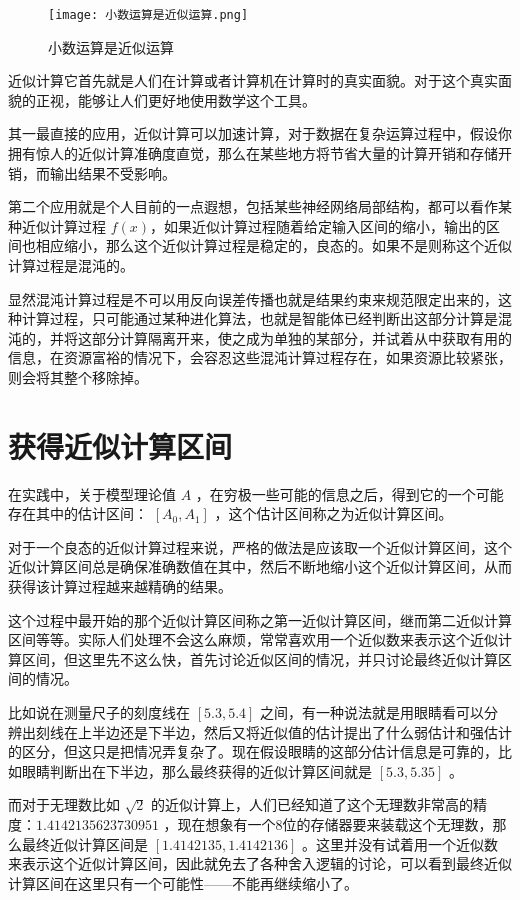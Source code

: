 \documentclass[12pt,oneside]{book}
\begin{document}
\begin{figure}[H]
\centering
\texttt{[image: 小数运算是近似运算.png]}
\caption{小数运算是近似运算}
\end{figure}

近似计算它首先就是人们在计算或者计算机在计算时的真实面貌。对于这个真实面貌的正视，能够让人们更好地使用数学这个工具。

其一最直接的应用，近似计算可以加速计算，对于数据在复杂运算过程中，假设你拥有惊人的近似计算准确度直觉，那么在某些地方将节省大量的计算开销和存储开销，而输出结果不受影响。

第二个应用就是个人目前的一点遐想，包括某些神经网络局部结构，都可以看作某种近似计算过程 $f(x)$，如果近似计算过程随着给定输入区间的缩小，输出的区间也相应缩小，那么这个近似计算过程是稳定的，良态的。如果不是则称这个近似计算过程是混沌的。

显然混沌计算过程是不可以用反向误差传播也就是结果约束来规范限定出来的，这种计算过程，只可能通过某种进化算法，也就是智能体已经判断出这部分计算是混沌的，并将这部分计算隔离开来，使之成为单独的某部分，并试着从中获取有用的信息，在资源富裕的情况下，会容忍这些混沌计算过程存在，如果资源比较紧张，则会将其整个移除掉。



\section{获得近似计算区间}
在实践中，关于模型理论值 $A$ ，在穷极一些可能的信息之后，得到它的一个可能存在其中的估计区间： $[A_0, A_1]$ ，这个估计区间称之为近似计算区间。

对于一个良态的近似计算过程来说，严格的做法是应该取一个近似计算区间，这个近似计算区间总是确保准确数值在其中，然后不断地缩小这个近似计算区间，从而获得该计算过程越来越精确的结果。

这个过程中最开始的那个近似计算区间称之第一近似计算区间，继而第二近似计算区间等等。实际人们处理不会这么麻烦，常常喜欢用一个近似数来表示这个近似计算区间，但这里先不这么快，首先讨论近似区间的情况，并只讨论最终近似计算区间的情况。

比如说在测量尺子的刻度线在 $[5.3, 5.4]$ 之间，有一种说法就是用眼睛看可以分辨出刻线在上半边还是下半边，然后又将近似值的估计提出了什么弱估计和强估计的区分，但这只是把情况弄复杂了。现在假设眼睛的这部分估计信息是可靠的，比如眼睛判断出在下半边，那么最终获得的近似计算区间就是 $[5.3, 5.35]$ 。

而对于无理数比如 $\sqrt{2}$ 的近似计算上，人们已经知道了这个无理数非常高的精度：$ 1.4142135623730951 $ ，现在想象有一个8位的存储器要来装载这个无理数，那么最终近似计算区间是 $ [1.4142135, 1.4142136] $ 。这里并没有试着用一个近似数来表示这个近似计算区间，因此就免去了各种舍入逻辑的讨论，可以看到最终近似计算区间在这里只有一个可能性——不能再继续缩小了。
\end{document}
